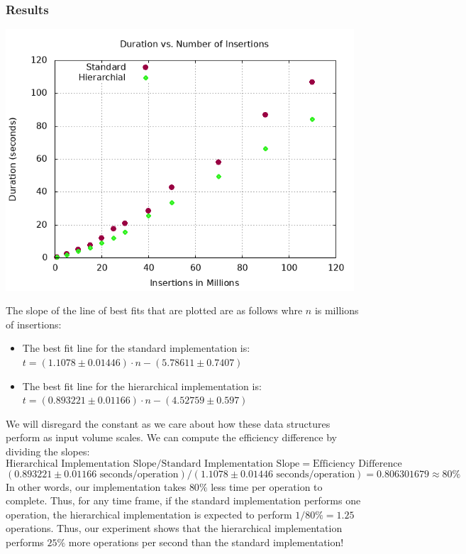 \subsubsection{Results}
\begin{center}
    \includegraphics[width=13cm]{plots/scale-nm.png}
\end{center}
The slope of the line of best fits that are plotted are as follows whre $n$ is millions of insertions:
\begin{itemize}
    \item The best fit line for the standard implementation is: $t = (1.1078 \pm 0.01446 )\cdot n - (5.78611   \pm 0.7407)$
    \item The best fit line for the hierarchical implementation is: $t = (0.893221 \pm 0.01166 )\cdot n - (4.52759 \pm 0.597 )$
\end{itemize}
We will disregard the constant as we care about how these data structures perform as input volume scales. We can compute the efficiency difference by dividing the slopes:
$$\text{Hierarchical Implementation Slope}/ \text{Standard Implementation Slope} = \text{Efficiency Difference}$$
$$(0.893221 \pm 0.01166 \text{ seconds/operation}) / (1.1078 \pm 0.01446 \text{ seconds/operation}) = 0.806301679 \approx 80\%$$
In other words, our implementation takes $80\%$ less time per operation to complete. 
Thus, for any time frame, if the standard implementation performs one operation, the hierarchical implementation is expected to perform $1/80\% = 1.25$ operations.
Thus, our experiment shows that the hierarchical implementation performs $25\%$ more operations per second than the standard implementation!

